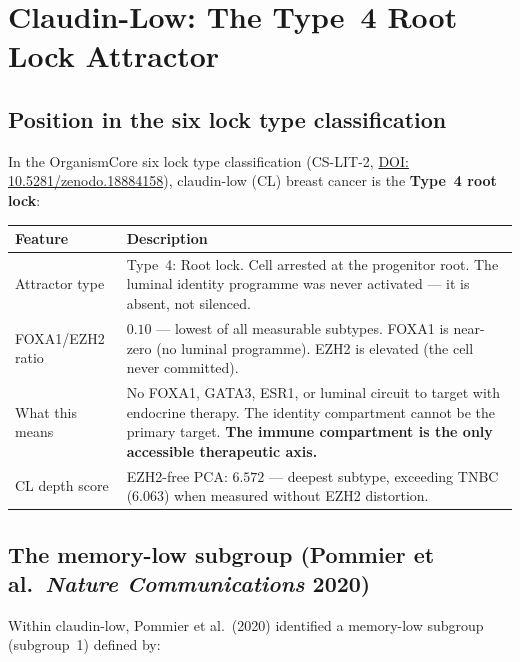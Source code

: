 \documentclass[12pt, a4paper]{article}
\begin{document}
\section{Claudin-Low: The Type~4 Root Lock Attractor}

\subsection{Position in the six lock type classification}

In the OrganismCore six lock type classification
(CS-LIT-2,
\href{https://doi.org/10.5281/zenodo.18884158}
{DOI: 10.5281/zenodo.18884158}), claudin-low (CL)
breast cancer is the \textbf{Type~4 root lock}:

\begin{center}
\begin{tabular}{p{3cm}p{9cm}}
\toprule
\textbf{Feature} & \textbf{Description} \\
\midrule
Attractor type &
Type~4: Root lock. Cell arrested at the progenitor
root. The luminal identity programme was never
activated --- it is absent, not silenced. \\[0.4em]
FOXA1/EZH2 ratio &
$0.10$ --- lowest of all measurable subtypes.
FOXA1 is near-zero (no luminal programme).
EZH2 is elevated (the cell never committed). \\[0.4em]
What this means &
No FOXA1, GATA3, ESR1, or luminal circuit to
target with endocrine therapy. The identity
compartment cannot be the primary target.
\textbf{The immune compartment is the only
accessible therapeutic axis.} \\[0.4em]
CL depth score &
EZH2-free PCA: $6.572$ --- deepest subtype,
exceeding TNBC ($6.063$) when measured
without EZH2 distortion. \\
\bottomrule
\end{tabular}
\end{center}

\subsection{The memory-low subgroup (Pommier et al.\
\textit{Nature Communications} 2020)}

Within claudin-low, Pommier et al.\ (2020) identified
a memory-low subgroup (subgroup~1) defined by:
\end{document}
